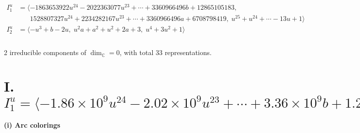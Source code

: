\documentclass[1p]{elsarticle_modified}
\theoremstyle{definition}
\begin{document}
\begin{align*}
I^u_{1}&=\langle 
-1863653922 u^{24}-2022363077 u^{23}+\cdots+3360966496 b+12865105183,\\
\phantom{I^u_{1}}&\phantom{= \langle  }1528807327 u^{24}+2234282167 u^{23}+\cdots+3360966496 a+6708798419,\;u^{25}+u^{24}+\cdots-13 u+1\rangle \\
I^u_{2}&=\langle 
- u^3+b-2 u,\;u^2 a+a^2+u^2+2 a+3,\;u^4+3 u^2+1\rangle \\
\\
\end{align*}
\raggedright * 2 irreducible components of $\dim_{\mathbb{C}}=0$, with total 33 representations.\\
\newpage
\renewcommand{\arraystretch}{1}
\centering \section*{I. $I^u_{1}= \langle -1.86\times10^{9} u^{24}-2.02\times10^{9} u^{23}+\cdots+3.36\times10^{9} b+1.29\times10^{10},\;1.53\times10^{9} u^{24}+2.23\times10^{9} u^{23}+\cdots+3.36\times10^{9} a+6.71\times10^{9},\;u^{25}+u^{24}+\cdots-13 u+1 \rangle$}
\flushleft \textbf{(i) Arc colorings}\\
\end{document}
